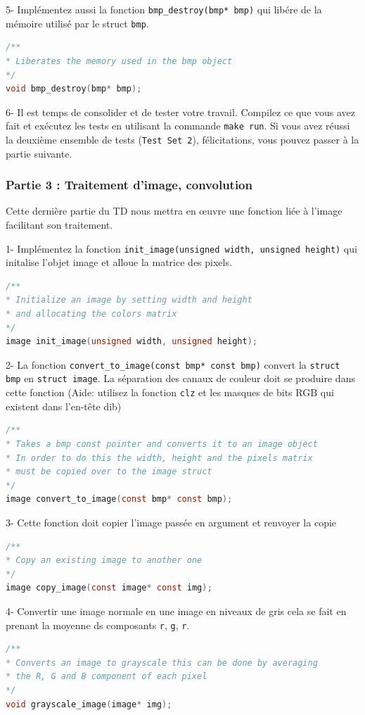 \documentclass[a4paper]{article}
\begin{document}
	5- Implémentez aussi la fonction \texttt{bmp\_destroy(bmp* bmp)} qui libére de la mémoire utilisé par le struct \texttt{bmp}.
	\begin{lstlisting}[language=C]
/**
* Liberates the memory used in the bmp object
*/ 
void bmp_destroy(bmp* bmp);
	\end{lstlisting}

	6- Il est temps de consolider et de tester votre travail. Compilez ce que vous avez fait et exécutez les tests en utilisant la commande \texttt{make run}. Si vous avez réussi la deuxième ensemble de tests (\texttt{Test Set 2}), félicitations, vous pouvez passer à la partie suivante.
	
	\subsubsection*{Partie 3 : Traitement d'image, convolution}
	Cette dernière partie du TD nous mettra en œuvre une fonction liée à l'image facilitant son traitement.
	
	1- Implémentez la fonction \texttt{init\_image(unsigned width, unsigned height)} qui initalise l'objet image et alloue la matrice des pixels.
	\begin{lstlisting}[language=C]
/**
* Initialize an image by setting width and height
* and allocating the colors matrix
*/
image init_image(unsigned width, unsigned height);
	\end{lstlisting}

	2- La fonction \texttt{convert\_to\_image(const bmp* const bmp)} convert la \texttt{struct bmp} en \texttt{struct image}. La séparation des canaux de couleur doit se produire dans cette fonction (Aide: utilisez la fonction \texttt{clz} et les masques de bits RGB qui existent dans l'en-tête dib)
	\begin{lstlisting}[language=C]
/**
* Takes a bmp const pointer and converts it to an image object
* In order to do this the width, height and the pixels matrix 
* must be copied over to the image struct
*/ 
image convert_to_image(const bmp* const bmp);
	\end{lstlisting}
	
	3- Cette fonction doit copier l'image passée en argument et renvoyer la copie
\begin{lstlisting}[language=C]
/**
* Copy an existing image to another one
*/ 
image copy_image(const image* const img);
\end{lstlisting}

	4- Convertir une image normale en une image en niveaux de gris cela se fait en prenant la moyenne ds composants \texttt{r}, \texttt{g}, \texttt{r}.
	\begin{lstlisting}[language=C]
/**
* Converts an image to grayscale this can be done by averaging
* the R, G and B component of each pixel
*/
void grayscale_image(image* img);
	\end{lstlisting}
\end{document}
